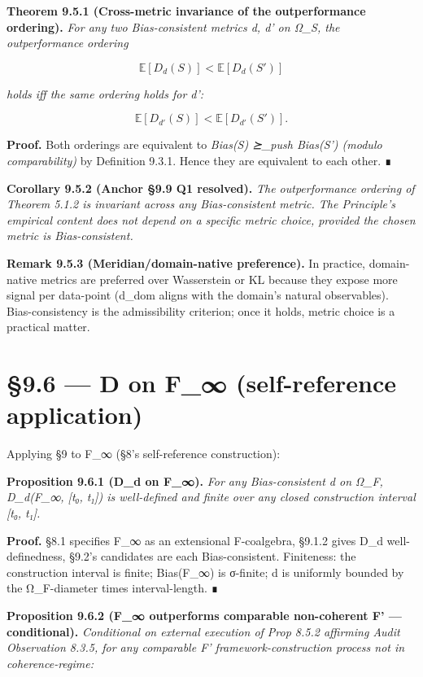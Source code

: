 \documentclass[11pt, openany]{book}
\newcommand{\sectionbreak}{\clearpage}
\begin{document}
\textbf{Theorem 9.5.1 (Cross-metric invariance of the outperformance ordering).} \textit{For any two Bias-consistent metrics d, d' on Ω\_\allowbreak{}S, the outperformance ordering}

\[
\mathbb{E}[D_d(S)] < \mathbb{E}[D_d(S')]
\]

\textit{holds iff the same ordering holds for d':}

\[
\mathbb{E}[D_{d'}(S)] < \mathbb{E}[D_{d'}(S')].
\]

\textbf{Proof.} Both orderings are equivalent to \textit{Bias(S) ⪰\_\allowbreak{}push Bias(S') (modulo comparability)} by Definition 9.3.1. Hence they are equivalent to each other. ∎

\textbf{Corollary 9.5.2 (Anchor §9.9 Q1 resolved).} \textit{The outperformance ordering of Theorem 5.1.2 is invariant across any Bias-consistent metric. The Principle's empirical content does not depend on a specific metric choice, provided the chosen metric is Bias-consistent.}

\textbf{Remark 9.5.3 (Meridian/domain-native preference).} In practice, domain-native metrics are preferred over Wasserstein or KL because they expose more signal per data-point (d\_\allowbreak{}dom aligns with the domain's natural observables). Bias-consistency is the admissibility criterion; once it holds, metric choice is a practical matter.

\sectionbreak

\section{§9.6 --- D on F\_\allowbreak{}∞ (self-reference application)}

Applying §9 to F\_\allowbreak{}∞ (§8's self-reference construction):

\textbf{Proposition 9.6.1 (D\_\allowbreak{}d on F\_\allowbreak{}∞).} \textit{For any Bias-consistent d on Ω\_\allowbreak{}F, D\_\allowbreak{}d(F\_\allowbreak{}∞, [t₀, t₁]) is well-defined and finite over any closed construction interval [t₀, t₁].}

\textbf{Proof.} §8.1 specifies F\_\allowbreak{}∞ as an extensional F-coalgebra, §9.1.2 gives D\_\allowbreak{}d well-definedness, §9.2's candidates are each Bias-consistent. Finiteness: the construction interval is finite; Bias(F\_\allowbreak{}∞) is σ-finite; d is uniformly bounded by the Ω\_\allowbreak{}F-diameter times interval-length. ∎

\textbf{Proposition 9.6.2 (F\_\allowbreak{}∞ outperforms comparable non-coherent F' --- conditional).} \textit{Conditional on external execution of Prop 8.5.2 affirming Audit Observation 8.3.5, for any comparable F' framework-construction process not in coherence-regime:}
\end{document}
